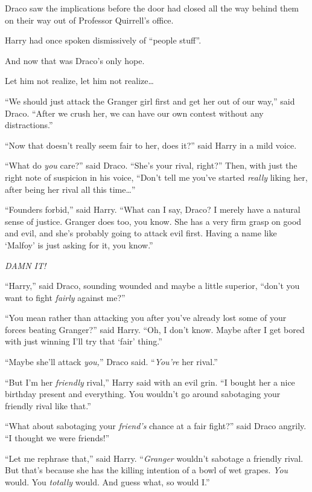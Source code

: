 \later

Draco saw the implications before the door had closed all the way behind them on their way out of Professor Quirrell’s office.

Harry had once spoken dismissively of “people stuff”.

And now that was Draco’s only hope.

Let him not realize, let him not realize…

“We should just attack the Granger girl first and get her out of our way,” said Draco. “After we crush her, we can have our own contest without any distractions.”

“Now that doesn’t really seem fair to her, does it?” said Harry in a mild voice.

“What do \emph{you} care?” said Draco. “She’s your rival, right?” Then, with just the right note of suspicion in his voice, “Don’t tell me you’ve started \emph{really} liking her, after being her rival all this time…”

“Founders forbid,” said Harry. “What can I say, Draco? I merely have a natural sense of justice. Granger does too, you know. She has a very firm grasp on good and evil, and she’s probably going to attack evil first. Having a name like ‘Malfoy’ is just asking for it, you know.”

\emph{DAMN IT!}

“Harry,” said Draco, sounding wounded and maybe a little superior, “don’t you want to fight \emph{fairly} against me?”

“You mean rather than attacking you after you’ve already lost some of your forces beating Granger?” said Harry. “Oh, I don’t know. Maybe after I get bored with just winning I’ll try that ‘fair’ thing.”

“Maybe she’ll attack \emph{you,}” Draco said. “\emph{You’re} her rival.”

“But I’m her \emph{friendly} rival,” Harry said with an evil grin. “I bought her a nice birthday present and everything. You wouldn’t go around sabotaging your friendly rival like that.”

“What about sabotaging your \emph{friend’s} chance at a fair fight?” said Draco angrily. “I thought we were friends!”

“Let me rephrase that,” said Harry. “\emph{Granger} wouldn’t sabotage a friendly rival. But that’s because she has the killing intention of a bowl of wet grapes. \emph{You} would. You \emph{totally} would. And guess what, so would I.”

